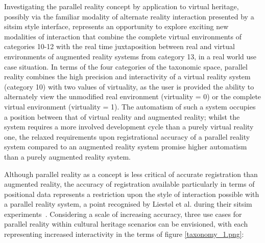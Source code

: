 Investigating the parallel reality concept by application to virtual heritage, possibly via the familiar modality of alternate reality interaction presented by a sitsim style interface, represents an opportunity to explore exciting new modalities of interaction that combine the complete virtual environments of categories 10-12 with the real time juxtaposition between real and virtual environments of augmented reality systems from category 13, in a real world use case situation. In terms of the four categories of the taxonomic space, parallel reality combines the high precision and interactivity of a virtual reality system (category 10) with two values of virtuality, as the user is provided the ability to alternately view the unmodified real environment (virtuality = 0) or the complete virtual environment (virtuality = 1). The automatism of such a system occupies a position between that of virtual reality and augmented reality; whilst the system requires a more involved development cycle than a purely virtual reality one, the relaxed requirements upon registrational accuracy of a parallel reality system compared to an augmented reality system promise higher automatism than a purely augmented reality system.


Although parallel reality as a concept is less critical of accurate registration than augmented reality, the accuracy of registration available particularly in terms of positional data represents a restriction upon the style of interaction possible with a parallel reality system, a point recognised by Liest\o l et al. during their sitsim experiments~\cite{Liestøl2012}. Considering a scale of increasing accuracy, three use cases for parallel reality within cultural heritage scenarios can be envisioned, with each representing increased interactivity in the terms of figure \ref{taxonomy_1.png}:

